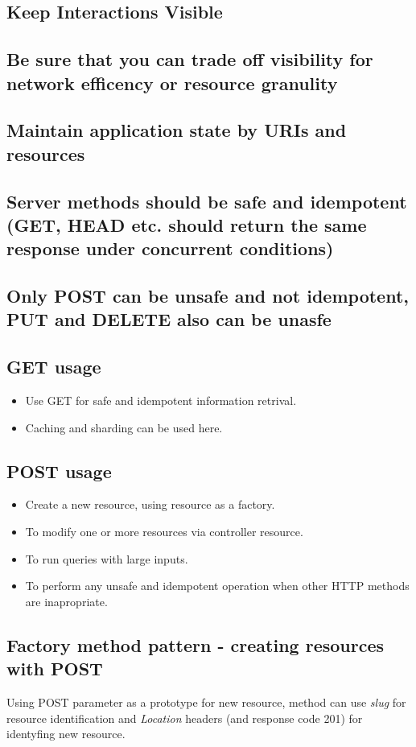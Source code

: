 \documentclass[11pt,a4paper]{article}
\begin{document}
\subsection{Keep Interactions Visible}
\subsection{Be sure that you can trade off visibility for network efficency or resource granulity}
\subsection{Maintain application state by URIs and resources}
\subsection{Server methods should be safe and idempotent (GET, HEAD etc. should return the same response under concurrent conditions)}
\subsection{Only POST can be unsafe and not idempotent, PUT and DELETE also can be unasfe}

\subsection{GET usage}
\begin{itemize}
	\item Use GET for safe and idempotent information retrival.
	\item Caching and sharding can be used here.
\end{itemize}

\subsection{POST usage}
\begin{itemize}
	\item Create a new resource, using resource as a factory.
	\item To modify one or more resources via controller resource.
	\item To run queries with large inputs.
	\item To perform any unsafe and idempotent operation when other HTTP methods are inapropriate.
\end{itemize}

\subsection{Factory method pattern - creating resources with POST}
Using POST parameter as a prototype for new resource, method can use \textit{slug} for resource identification and \textit{Location} headers (and response code 201) for identyfing new resource.
\end{document}
